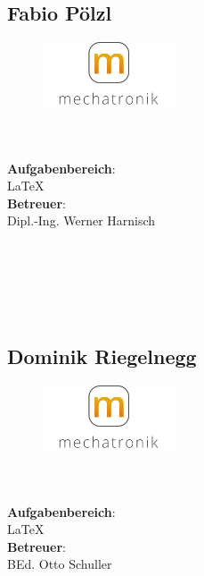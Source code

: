 \subsection*{Fabio Pölzl}
\begin{figure}
\begin{center}
  \includegraphics[width=0.35\textwidth]{fig/logoMecha}
\end{center}
\end{figure}
\mbox{}\\
\mbox{}\\
\textbf{Aufgabenbereich}:\\
\LaTeX{}\\
\textbf{Betreuer}:\\
Dipl.-Ing. Werner Harnisch
\mbox{}\\
\mbox{}\\
\mbox{}\\
\mbox{}\\
\mbox{}\\
\mbox{}\\

\subsection*{Dominik Riegelnegg}
\begin{figure}
\begin{center}
  \includegraphics[width=0.35\textwidth]{fig/logoMecha}
\end{center}
\end{figure}
\mbox{}\\
\mbox{}\\
\textbf{Aufgabenbereich}:\\
\LaTeX{}\\
\textbf{Betreuer}:\\
BEd. Otto Schuller
\mbox{}\\
\mbox{}\\
\mbox{}\\
\mbox{}\\
\mbox{}\\
\newpage